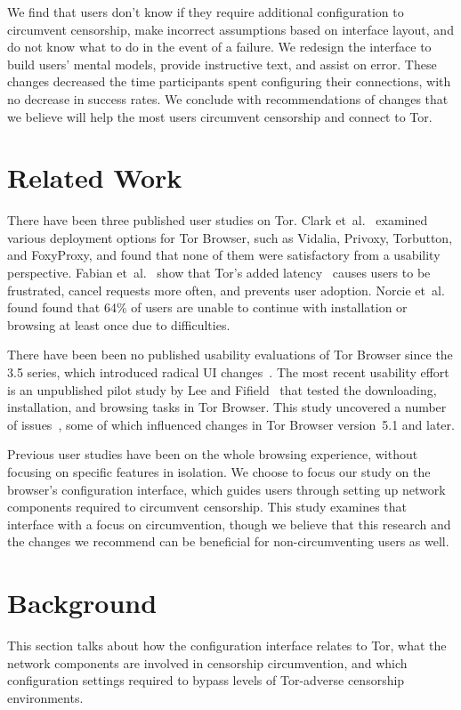 \documentclass[USenglish,oneside,twocolumn]{article}
\begin{document}
We find that users don't know if they require additional configuration to circumvent censorship, make incorrect assumptions based on interface layout, and do not know what to do in the event of a failure. We redesign the interface to build users' mental models, provide instructive text, and assist on error. These changes decreased the time participants spent configuring their connections, with no decrease in success rates. We conclude with recommendations of changes that we believe will help the most users circumvent censorship and connect to Tor. 

\section{Related Work} 
There have been three published user studies on Tor. Clark et~al.~\cite{clark2007usability} examined various deployment
options for Tor Browser, such as Vidalia, Privoxy, Torbutton, and FoxyProxy, and found that none of them 
were satisfactory from a usability perspective. Fabian et~al.~\cite{fabian2010privately} show that Tor's added
latency~\cite{dingledine2009performance} causes users
to be frustrated, cancel requests more often, and prevents user adoption. 
Norcie et~al.~\cite{norcie2012eliminating} found found that 
64\% of users are unable to continue with installation or browsing at least once due to difficulties.

There have been been no published usability evaluations of
Tor Browser since the 3.5 series, which introduced radical UI changes~\cite{torbrowser-35}.
The most recent usability effort is an unpublished pilot study by Lee and Fifield~\cite{uxsprint} 
that tested the downloading, installation, and browsing tasks in Tor Browser.  This study uncovered a number of issues~\cite{uxsprint2015-tickets},
some of which influenced changes in Tor Browser version~5.1 and later.

Previous user studies have been on the whole browsing experience,
without focusing on specific features in isolation.
We choose to focus our study on 
the browser's configuration interface, which guides users through setting up network components required to circumvent censorship. 
This study examines that interface with a focus on circumvention,
though we believe that this research and the changes we recommend
can be beneficial for non-circumventing users as well.

\section{Background}
This section talks about how the configuration interface relates to Tor, what the network components are involved in censorship circumvention, and which configuration settings required to bypass levels of Tor-adverse censorship environments. 
\end{document}
